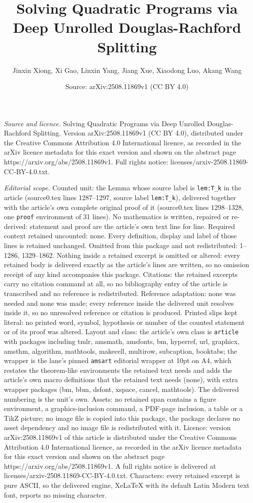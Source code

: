 \documentclass[10pt,a4paper]{amsart}
\title[Solving Quadratic Programs via Deep Unrolled Douglas-Rachfor]{Solving Quadratic Programs via Deep Unrolled Douglas-Rachford Splitting}
\author{Jinxin Xiong, Xi Gao, Linxin Yang, Jiang Xue, Xiaodong Luo, Akang Wang}
\date{Source: arXiv:2508.11869v1 (CC BY 4.0)}
\begin{document}
\maketitle

\noindent\emph{Source and licence.} Solving Quadratic Programs via Deep Unrolled Douglas-Rachford Splitting. Version arXiv:2508.11869v1 (CC BY 4.0), distributed under the Creative Commons Attribution 4.0 International licence, as recorded in the arXiv licence metadata for this exact version and shown on the abstract page https://arxiv.org/abs/2508.11869v1. Full rights notice: licenses/arxiv-2508.11869-CC-BY-4.0.txt.\par\smallskip

\noindent\textit{Editorial scope.} Counted unit: the Lemma whose source label is \texttt{lem:T\_k} in the article (source0.tex lines 1287--1297, source label \texttt{lem:T\_k}), delivered together with the article's own complete original proof of it (source0.tex lines 1298--1328, one \texttt{proof} environment of 31 lines). No mathematics is written, repaired or re-derived: statement and proof are the article's own text line for line. Required context retained uncounted: none. Every definition, display and label of those lines is retained unchanged. Omitted from this package and not redistributed: 1--1286, 1329--1862. Nothing inside a retained excerpt is omitted or altered: every retained body is delivered exactly as the article's lines are written, so no omission receipt of any kind accompanies this package. Citations: the retained excerpts carry no citation command at all, so no bibliography entry of the article is transcribed and no reference is redistributed. Reference adaptation: none was needed and none was made; every reference inside the delivered unit resolves inside it, so no unresolved reference or citation is produced. Printed slips kept literal: no printed word, symbol, hypothesis or number of the counted statement or of its proof was altered. Layout and class: the article's own class is \texttt{article} with packages including tmlr, amsmath, amsfonts, bm, hyperref, url, graphicx, amsthm, algorithm, mathtools, makecell, multirow, subcaption, booktabs; the wrapper is the lane's pinned \texttt{amsart} editorial wrapper at 10pt on A4, which restates the theorem-like environments the retained text needs and adds the article's own macro definitions that the retained text needs (none), with extra wrapper packages (bm, bbm, dsfont, xspace, cancel, mathtools). The delivered numbering is the unit's own. Assets: no retained span contains a figure environment, a graphics-inclusion command, a PDF-page inclusion, a table or a TikZ picture; no image file is copied into this package, the package declares no asset dependency and no image file is redistributed with it. Licence: version arXiv:2508.11869v1 of this article is distributed under the Creative Commons Attribution 4.0 International licence, as recorded in the arXiv licence metadata for this exact version and shown on the abstract page https://arxiv.org/abs/2508.11869v1. A full rights notice is delivered at licenses/arxiv-2508.11869-CC-BY-4.0.txt. Characters: every retained excerpt is pure ASCII, so the delivered engine, XeLaTeX with its default Latin Modern text font, reports no missing character.
\end{document}
